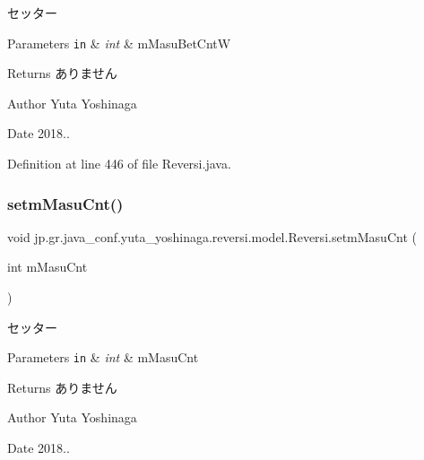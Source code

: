 セッター 


\begin{DoxyParams}[1]{Parameters}
\mbox{\tt in}  & {\em int} & m\+Masu\+Bet\+CntW \\
\hline
\end{DoxyParams}
\begin{DoxyReturn}{Returns}
ありません 
\end{DoxyReturn}
\begin{DoxyAuthor}{Author}
Yuta Yoshinaga 
\end{DoxyAuthor}
\begin{DoxyDate}{Date}
2018.. 
\end{DoxyDate}


Definition at line 446 of file Reversi.\+java.

\mbox{\label{classjp_1_1gr_1_1java__conf_1_1yuta__yoshinaga_1_1reversi_1_1model_1_1_reversi_a71ae120574f664807065c0ec033bbdb7}} 
\subsubsection{\texorpdfstring{setm\+Masu\+Cnt()}{setmMasuCnt()}}
{\footnotesize\ttfamily void jp.\+gr.\+java\+\_\+conf.\+yuta\+\_\+yoshinaga.\+reversi.\+model.\+Reversi.\+setm\+Masu\+Cnt (\begin{DoxyParamCaption}\item[{int}]{m\+Masu\+Cnt }\end{DoxyParamCaption})}



セッター 


\begin{DoxyParams}[1]{Parameters}
\mbox{\tt in}  & {\em int} & m\+Masu\+Cnt \\
\hline
\end{DoxyParams}
\begin{DoxyReturn}{Returns}
ありません 
\end{DoxyReturn}
\begin{DoxyAuthor}{Author}
Yuta Yoshinaga 
\end{DoxyAuthor}
\begin{DoxyDate}{Date}
2018.. 
\end{DoxyDate}


